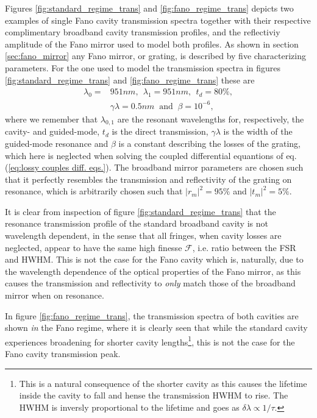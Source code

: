 Figures \ref{fig:standard_regime_trans} and \ref{fig:fano_regime_trans} depicts two examples of single Fano cavity transmission spectra together with their respective complimentary broadband cavity transmission profiles, and the reflectiviy amplitude of the Fano mirror used to model both profiles. As shown in section \ref{sec:fano_mirror} any Fano mirror, or grating, is described by five characterizing parameters. For the one used to model the transmission spectra in figures \ref{fig:standard_regime_trans} and \ref{fig:fano_regime_trans}  these are 
\begin{equation}
    \begin{split}
    \lambda_0 = &951 nm,\:\: \lambda_1 = 951 nm,\:\: t_d = 80\%,\\ &\gamma \lambda = 0.5 nm\: \text{ and }\: \beta = 10^{-6},
    \end{split}
\end{equation}
where we remember that $\lambda_{0,1}$ are the resonant wavelengths for, respectively, the cavity- and guided-mode, $t_d$ is the direct transmission, $\gamma \lambda$ is the width of the guided-mode resonance and $\beta$ is a constant describing the losses of the grating, which here is neglected when solving the coupled differential equantions of eq. (\ref{eq:lossy couples diff. eqs.}). The broadband mirror parameters are chosen such that it perfectly resembles the transmission and reflectivity of the grating on resonance, which is arbitrarily chosen such that $|r_{m}|^2=95\%$ and $|t_{m}|^2 = 5\%$.

It is clear from inspection of figure \ref{fig:standard_regime_trans} that the resonance transmission profile of the standard broadband cavity is not wavelength dependent, in the sense that all fringes, when cavity losses are neglected, appear to have the same high finesse $\mathcal{F}$, i.e. ratio between the FSR and HWHM. This is not the case for the Fano cavity which is, naturally, due to the wavelength dependence of the optical properties of the Fano mirror, as this causes the transmission and reflectivity to \emph{only} match those of the broadband mirror when on resonance. 

In figure \ref{fig:fano_regime_trans}, the transmission spectra of both cavities are shown \emph{in} the Fano regime, where it is clearly seen that while the standard cavity experiences broadening for shorter cavity lengths\footnote{This is a natural consequence of the shorter cavity as this causes the lifetime inside the cavity to fall and hense the transmission HWHM to rise. The HWHM is inversly proportional to the lifetime and goes as $\delta \lambda \propto 1/\tau$.}, this is not the case for the Fano cavity transmission peak.

